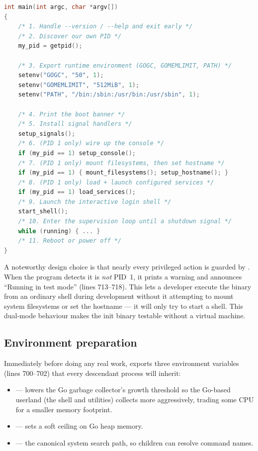 \begin{lstlisting}[language=C, caption={The phased structure of main() (abridged)}]
int main(int argc, char *argv[])
{
    /* 1. Handle --version / --help and exit early */
    /* 2. Discover our own PID */
    my_pid = getpid();

    /* 3. Export runtime environment (GOGC, GOMEMLIMIT, PATH) */
    setenv("GOGC", "50", 1);
    setenv("GOMEMLIMIT", "512MiB", 1);
    setenv("PATH", "/bin:/sbin:/usr/bin:/usr/sbin", 1);

    /* 4. Print the boot banner */
    /* 5. Install signal handlers */
    setup_signals();
    /* 6. (PID 1 only) wire up the console */
    if (my_pid == 1) setup_console();
    /* 7. (PID 1 only) mount filesystems, then set hostname */
    if (my_pid == 1) { mount_filesystems(); setup_hostname(); }
    /* 8. (PID 1 only) load + launch configured services */
    if (my_pid == 1) load_services();
    /* 9. Launch the interactive login shell */
    start_shell();
    /* 10. Enter the supervision loop until a shutdown signal */
    while (running) { ... }
    /* 11. Reboot or power off */
}
\end{lstlisting}

A noteworthy design choice is that nearly every privileged action is guarded by
. When the program detects it is \emph{not} PID~1, it
prints a warning and announces ``Running in test mode'' (lines 713--718). This
lets a developer execute the binary from an ordinary shell during development
without it attempting to mount system filesystems or set the hostname --- it
will only try to start a shell. This dual-mode behaviour makes the init binary
testable without a virtual machine.

\subsection{Environment preparation}

Immediately before doing any real work,  exports three environment
variables (lines 700--702) that every descendant process will inherit:

\begin{itemize}
  \item {} --- lowers the Go garbage collector's growth threshold so
        the Go-based userland (the shell and utilities) collects more
        aggressively, trading some CPU for a smaller memory footprint.
  \item {} --- sets a soft ceiling on Go heap memory.
  \item {} --- the canonical system search
        path, so children can resolve command names.
\end{itemize}

